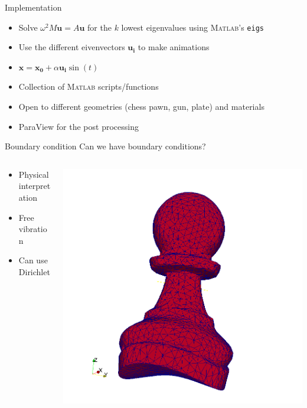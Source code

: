 \documentclass{beamer}[10pt]
\begin{document}
\begin{frame}{Implementation}
\begin{itemize}
\item {Solve $	\omega^2 M\boldsymbol{u} = A\boldsymbol{u}$ for the $k$ lowest eigenvalues using \textsc{Matlab}'s \texttt{eigs}}
\item {Use the different eivenvectors $\boldsymbol{u_i}$ to make animations}
\item {$\boldsymbol{x}=\boldsymbol{x_0}+\alpha \boldsymbol{u_i}\sin(t)$}
\item {Collection of \textsc{Matlab} scripts/functions}
\item {Open to different geometries (chess pawn, gun, plate) and materials}
\item {ParaView for the post processing}
\end{itemize}
\end{frame}
\begin{frame}{Boundary condition}
\centering
Can we have boundary conditions?
\vspace*{2em}
  \begin{columns}[T]
    \begin{column}{.5\textwidth}
    \begin{itemize}
    		\item {Physical interpretation}
		\item {Free vibration}
		\item {Can use Dirichlet}
	\end{itemize}
    \end{column}
    \begin{column}{.5\textwidth}
    \includegraphics[width=0.7\textwidth>]{PawnMode15.png}
    \end{column}
  \end{columns}
\end{frame}
\end{document}
